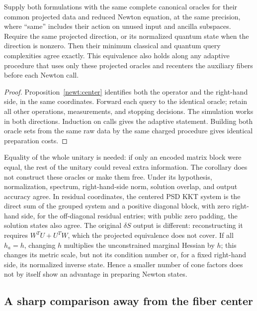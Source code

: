 \begin{corollary}
\label{newt:oracle}
Supply both formulations with the same complete canonical oracles for
their common projected data and reduced Newton equation, at the same
precision, where ``same'' includes their action on unused input and
ancilla subspaces.  Require the same
projected direction, or its normalized quantum state when the direction
is nonzero.  Then their minimum
classical and quantum query complexities agree exactly.  This equivalence
also holds along any adaptive procedure that uses only these projected
oracles and recenters the auxiliary fibers before each Newton call.
\end{corollary}
\begin{proof}
Proposition~\ref{newt:center} identifies both the operator and the right-hand
side, in the same coordinates.  Forward each query to the identical oracle;
retain all other operations, measurements, and stopping decisions.  The
simulation works in both directions.  Induction on calls gives the
adaptive statement.  Building both oracle sets from the same raw data by
the same charged procedure gives identical preparation costs.
\end{proof}

Equality of the whole unitary is needed: if only an encoded matrix
block were equal, the rest of the unitary could reveal extra
information.  The corollary does not construct these oracles or make
them free.  Under its hypothesis, normalization, spectrum,
right-hand-side norm, solution overlap, and output accuracy agree.  In
residual coordinates, the centered PSD KKT system is the direct sum of the grouped
system and a positive diagonal block, with zero right-hand side, for the
off-diagonal residual entries; with public zero padding, the solution
states also agree.  The original $\delta S$
output is different: reconstructing it requires $W^TU+U^TW$, which the
projected equivalence does not cover.  If all $h_a=h$, changing $h$
multiplies the unconstrained marginal Hessian by $h$; this changes its
metric scale, but not its condition number or, for a fixed right-hand
side, its normalized inverse state.  Hence a smaller number of cone factors does not by itself show an
advantage in preparing Newton states.

\subsection{A sharp comparison away from the fiber center}


